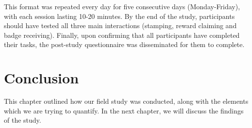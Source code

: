 This format was repeated every day for five consecutive days (Monday-Friday), with each session lasting 10-20 minutes. By the end of the study, participants should have tested all three main interactions (stamping, reward claiming and badge receiving). Finally, upon confirming that all participants have completed their tasks, the post-study questionnaire was disseminated for them to complete.
 
\section{Conclusion}
This chapter outlined how our field study was conducted, along with the elements which we are trying to quantify. In the next chapter, we will discuss the findings of the study.